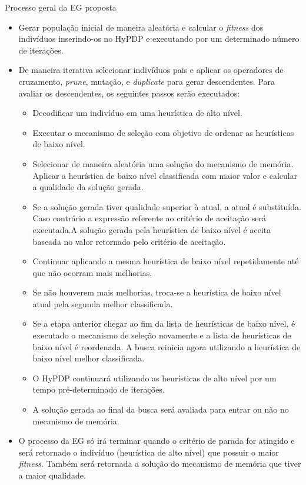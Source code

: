 \begin{frame}[allowframebreaks]{Processo geral da EG proposta}	
	
	\begin{itemize}
		\item Gerar população inicial de maneira aleatória e calcular o \textit{fitness} dos indivíduos inserindo-os no HyPDP e executando por um determinado número de iterações.
		\item De maneira iterativa selecionar indivíduos pais e aplicar os operadores
		de cruzamento, \textit{prune}, mutação, e \textit{duplicate} para gerar descendentes. Para avaliar os descendentes, os seguintes passos serão executados:
		\begin{itemize}
			\item Decodificar um indivíduo em uma  heurística de alto nível.
			\item Executar o mecanismo de seleção com objetivo de ordenar as heurísticas de baixo nível.
			\item Selecionar de maneira aleatória uma solução do mecanismo de memória. Aplicar a heurística de baixo nível classificada com maior valor e calcular a qualidade da solução gerada.
			\item Se a solução gerada tiver qualidade superior à atual, a atual é substituída. Caso contrário a expressão referente ao critério de aceitação será executada.A  solução gerada pela
			heurística de baixo nível é aceita baseada no valor retornado pelo critério de aceitação.
			\item Continuar aplicando  a mesma heurística de baixo nível repetidamente até que não ocorram mais melhorias.
			\item Se não houverem mais melhorias, troca-se a heurística de baixo nível atual pela
			segunda melhor classificada.
			\item Se a etapa anterior chegar ao fim da lista de heurísticas de baixo nível, é executado o
			mecanismo de seleção novamente e a lista de heurísticas de baixo nível é reordenada.
			A busca reinicia agora utilizando a heurística de baixo nível melhor classificada.
			\item O HyPDP continuará utilizando as heurísticas de alto
			nível por um tempo pré-determinado
			de iterações.
			\item A solução gerada ao final da busca será avaliada para
			entrar ou não no mecanismo de memória.
		\end{itemize}
		\item O processo da EG só irá terminar quando o critério de parada for atingido e será retornado o indivíduo (heurística de alto nível) que possuir o maior \textit{fitness}. Também será retornada a solução do mecanismo de memória que tiver a maior qualidade.
	\end{itemize}

\end{frame}



